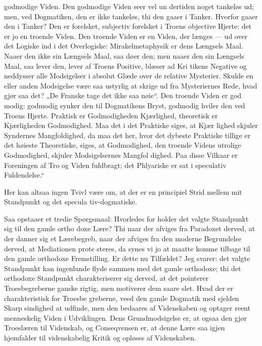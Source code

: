 \documentclass[12pt]{book}
\newcommand{\opage}[1]{\marginnote{\footnotesize\textit{[#1]}}}
\begin{document}
godmodige Viden. Den godmodige Viden seer vel un\-%
dertiden noget tankeløs ud; men, ved Dogmatiken, den
er ikke tankeløs, thi den gaaer i Tanker. Hvorfor gaaer
den i Tanker? Den er forelsket, subjectiv forelsket i
Troens objective Hjerte: det er jo en troende Viden.
Den troende Viden er en Viden, der længes --- ud over
det Logiske ind i det Overlogiske: Mirakelmetaphysik
er dens Længsels Maal. Naaer den ikke sin Længsels
Maal, saa døer den; men naaer den sin Længsels Maal,
saa lever den, lever af Troens Positive, blæser ad Kri\-%
tikens Negative og neddysser alle Modsigelser i absolut
Glæde over de relative Mysterier. Skulde en eller
anden Modsigelse være saa ustyrlig at skrige ud fra
Mysteriernes Rede, hvad gjør saa det? „De Franske
tage det ikke saa nøie“. Den troende Viden er god\-%
modig: godmodig synker den til Dogmatikens Bryst,
godmodig hviler den ved Troens Hjerte. Praktisk er
Godmodigheden Kjærlighed, theoretisk er Kjærligheden
Godmodighed. Maa det i det Praktiske siges, at Kjær\-%
lighed skjuler Syndernes Mangfoldighed, da maa det
her, hvor det dybeste Praktiske tillige er det høieste
Theoretiske, siges, at Godmodighed, den troende Videns
utrolige Godmodighed, skjuler Modsigelsernes Mangfol\-%
dighed. Paa disse Vilkaar er Foreningen af Tro og
\opage{245}\setcounter{footnote}{0}%
Viden fuldbragt; det Phlyariske er sat i speculativ
Fuldendelse.“

Her kan altsaa ingen Tvivl være om, at der er en
principiel Strid mellem mit Standpunkt og det specula\-%
tiv-dogmatiske.

Saa opstaaer et tredie Spørgsmaal: Hvorledes for\-%
holder det valgte Standpunkt sig til den gamle ortho\-%
doxe Lære? Thi naar der afviges fra Paradoxet derved,
at der danner sig et Lærebegreb, naar der afviges fra
den moderne Begrundelse derved, at Mediationen prote\-%
steres, da synes vi jo at maatte komme tilbage til den
gamle orthodoxe Fremstilling. Er dette nu Tilfældet?
Jeg svarer: det valgte Standpunkt kan ingenlunde flyde
sammen med det gamle orthodoxe; thi det orthodoxe
Standpunkt charakteriserer sig derved, at det pointerer
Troesbegreberne ganske rigtig, men motiverer dem
saare slet. Hvad der er charakteristisk for Troesbe\-%
greberne, veed den gamle Dogmatik med sjelden Skarp\-%
sindighed at udfinde, men den bedaares af Videnskaben
og optager reent menneskelig Viden i Udviklingen. Dens
Grundmodsigelse er, at ogsaa den gjør Troeslæren til
Videnskab, og Conseqvensen er, at denne Lære saa
igjen hjemfalder til videnskabelig Kritik og opløses af
Videnskaben.
\end{document}
